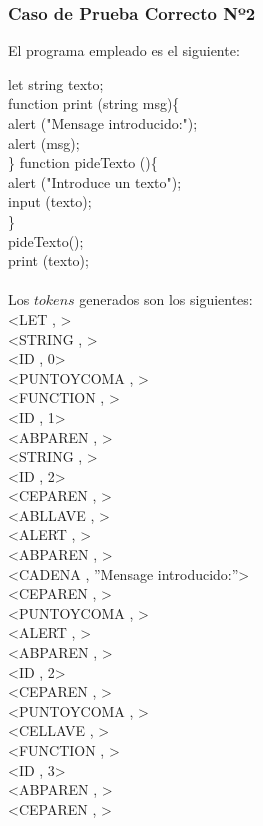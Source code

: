 \documentclass{article}
\begin{document}
\subsubsection{Caso de Prueba Correcto Nº2}
\begin{center} 
El programa empleado es el siguiente:
\end{center}
\begin{flushleft}
let string texto;\\
function print (string msg)\{\\
\qquad	alert ("Mensage introducido:");\\
\qquad	alert (msg);\\
\}
function pideTexto ()\{\\
\qquad	alert ("Introduce un texto");\\
\qquad	input (texto);\\
\}\\
pideTexto();\\
print (texto);\\
\quad\\
Los $tokens$ generados son los siguientes:\\
<LET , >\\
<STRING , >\\
<ID , 0>\\
<PUNTOYCOMA , >\\
<FUNCTION , >\\
<ID , 1>\\
<ABPAREN , >\\
<STRING , >\\
<ID , 2>\\
<CEPAREN , >\\
<ABLLAVE , >\\
<ALERT , >\\
<ABPAREN , >\\
<CADENA , ''Mensage introducido:''>\\
<CEPAREN , >\\
<PUNTOYCOMA , >\\
<ALERT , >\\
<ABPAREN , >\\
<ID , 2>\\
<CEPAREN , >\\
<PUNTOYCOMA , >\\
<CELLAVE , >\\
<FUNCTION , >\\
<ID , 3>\\
<ABPAREN , >\\
<CEPAREN , >\\

\end{flushleft}
\end{document}
